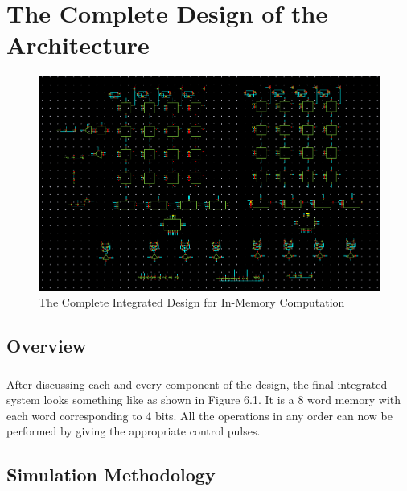 %
%
\let\textcircled=\pgftextcircled
\chapter{The Complete Design of the Architecture}
\label{chap:Final View}

\begin{figure}[H]
\centering
\includegraphics[width=1.0\textwidth]{full_design.png}
\caption{The Complete Integrated Design for In-Memory Computation}
\label{fig:Figure}
\end{figure}

\section{Overview}
\paragraph{}
After discussing each and every component of the design, the final integrated system looks something like as shown in Figure 6.1. It is a 8 word memory with each word corresponding to 4 bits. All the operations in any order can now be performed by giving the appropriate control pulses.

\section{Simulation Methodology}
\paragraph{}

